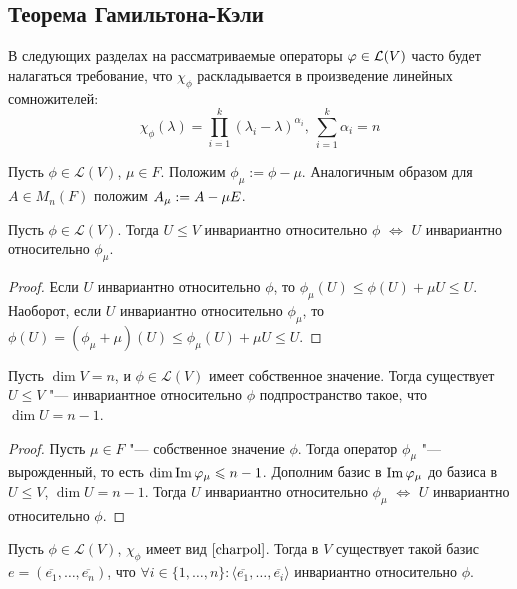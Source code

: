 \subsection{Теорема Гамильтона-Кэли}

В следующих разделах на рассматриваемые операторы $\phi \hm{\in} \mathcal{L}(V)$ часто будет налагаться требование, что $\chi_\phi$ раскладывается в произведение линейных сомножителей:
\begin{equation}\tag{$\star$}\label{charpol}
	\chi_\phi(\lambda) = \prod_{i = 1}^k(\lambda_i - \lambda)^{\alpha_i},~\sum_{i = 1}^k\alpha_i = n
\end{equation}

\begin{definition}
	Пусть $\phi \in \mathcal{L}(V)$, $\mu \in F$. Положим $\phi_\mu := \phi - \mu$. Аналогичным образом для $A \in M_n(F)$ положим $A_\mu \hm{:=} A - \mu E$.
\end{definition}

\begin{proposition}
	Пусть $\phi \in \mathcal{L}(V)$. Тогда $U \le V$ инвариантно относительно $\phi$ $\Leftrightarrow$ $U$ инвариантно относительно $\phi_\mu$.
\end{proposition}

\begin{proof}
	Если $U$ инвариантно относительно $\phi$, то $\phi_\mu(U) \le \phi(U) + \mu U \le U$. Наоборот, если $U$ инвариантно относительно $\phi_\mu$, то $\phi(U) = (\phi_\mu + \mu)(U) \le \phi_\mu(U) + \mu U \le U$.
\end{proof}

\begin{proposition}
	Пусть $\dim{V} = n$, и $\phi \in \mathcal{L}(V)$ имеет собственное значение. Тогда существует $U \le V$ "--- инвариантное относительно $\phi$ подпространство такое, что $\dim{U} = n - 1$.
\end{proposition}

\begin{proof}
	Пусть $\mu \in F$ "--- собственное значение $\phi$. Тогда оператор $\phi_\mu$ "--- вырожденный, то есть $\dim{\operatorname{Im}{\ensuremath{\varphi}_\mu}} \leqslant n - 1$. Дополним базис в $\operatorname{Im}{\varphi_\mu}$ до базиса в $U \le V$, $\dim{U} = n - 1$. Тогда $U$ инвариантно относительно $\phi_\mu$ $\Leftrightarrow$ $U$ инвариантно относительно $\phi$.
\end{proof}

\begin{theorem}
	Пусть $\phi \in \mathcal{L}(V)$, $\chi_\phi$ имеет вид $\eqref*{charpol}$. Тогда в $V$ существует такой базис $e = (\overline{e_1}, \dots, \overline{e_n})$, что $\forall i \in \{1, \dots, n\}: \langle\overline{e_1}, \dots, \overline{e_i}\rangle$ инвариантно относительно $\phi$.
\end{theorem}

